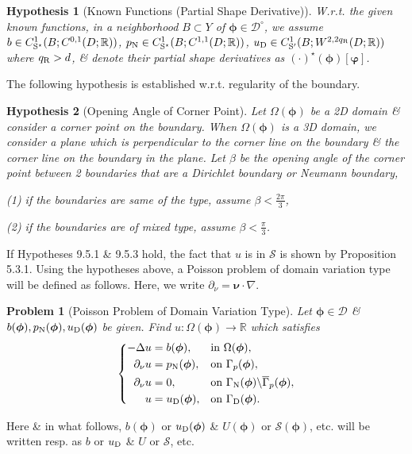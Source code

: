 \documentclass[oneside]{book}
\numberwithin{equation}{section}
\newtheorem{hypothesis}{Hypothesis}[chapter]
\newtheorem{problem}{Problem}[chapter]
\begin{document}
\begin{hypothesis}[Known Functions (Partial Shape Derivative)]
	W.r.t. the given known functions, in a neighborhood $B\subset Y$ of $\boldsymbol{\phi}\in\mathcal{D}^\circ$, we assume $b\in C_{\rm S^\star}^1(B;C^{0,1}(D;\mathbb{R}))$, $p_{\rm N}\in C_{\rm S^\star}^1(B;C^{1,1}(D;\mathbb{R}))$, $u_{\rm D}\in C_{\rm S'}^1(B;W^{2,2q_{\rm R}}(D;\mathbb{R}))$ where $q_{\rm R} > d$, \& denote their partial shape derivatives as $(\cdot)^\star(\boldsymbol{\phi})[\boldsymbol{\varphi}]$.
\end{hypothesis}
The following hypothesis is established w.r.t. regularity of the boundary.

\begin{hypothesis}[Opening Angle of Corner Point]
	Let $\Omega(\boldsymbol{\phi})$ be a 2D domain \& consider a corner point on the boundary. When $\Omega(\boldsymbol{\phi})$ is a 3D domain, we consider a plane which is perpendicular to the corner line on the boundary \& the corner line on the boundary in the plane. Let $\beta$ be the opening angle of the corner point between 2 boundaries that are a Dirichlet boundary or Neumann boundary,
	\begin{enumerate*}
		\item[(1)] if the boundaries are same of the type, assume $\beta < \frac{2\pi}{3}$,
		\item[(2)] if the boundaries are of mixed type, assume $\beta < \frac{\pi}{3}$.
	\end{enumerate*}
\end{hypothesis}
If Hypotheses 9.5.1 \& 9.5.3 hold, the fact that $u$ is in $\mathcal{S}$ is shown by Proposition 5.3.1. Using the hypotheses above, a Poisson problem of domain variation type will be defined as follows. Here, we write $\partial_\nu = \boldsymbol{\nu}\cdot\nabla$.

\begin{problem}[Poisson Problem of Domain Variation Type]
	Let $\boldsymbol{\phi}\in\mathcal{D}$ \& $b(\boldsymbol{\phi}),p_{\rm N}(\boldsymbol{\phi}),u_{\rm D}(\boldsymbol{\phi})$ be given. Find $u:\Omega(\boldsymbol{\phi})\to\mathbb{R}$ which satisfies
	\begin{equation*}
		\left\{\begin{split}
			-\Delta u &= b(\boldsymbol{\phi}),&&\mbox{in }\Omega(\boldsymbol{\phi}),\\
			\partial_\nu u &= p_{\rm N}(\boldsymbol{\phi}),&&\mbox{on }\Gamma_p(\boldsymbol{\phi}),\\
			\partial_\nu u &= 0,&&\mbox{on }\Gamma_{\rm N}(\boldsymbol{\phi})\backslash\overline{\Gamma}_p(\boldsymbol{\phi}),\\
			u &= u_{\rm D}(\boldsymbol{\phi}),&&\mbox{on }\Gamma_{\rm D}(\boldsymbol{\phi}).
		\end{split}\right.
	\end{equation*}
\end{problem}
Here \& in what follows, $b(\boldsymbol{\phi})$ or $u_{\rm D}(\boldsymbol{\phi})$ \& $U(\boldsymbol{\phi})$ or $\mathcal{S}(\boldsymbol{\phi})$, etc. will be written resp. as $b$ or $u_{\rm D}$ \& $U$ or $\mathcal{S}$, etc.
\end{document}
